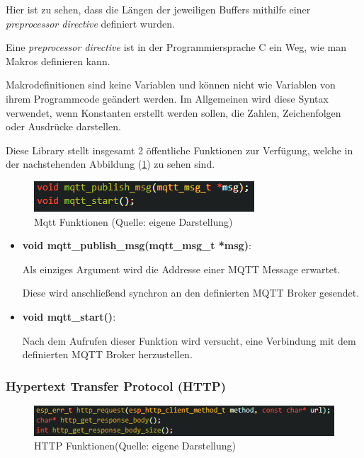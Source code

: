 Hier ist zu sehen, dass die Längen der jeweiligen Buffers mithilfe einer \textit{preprocessor directive} definiert wurden. 

Eine \textit{preprocessor directive} ist in der Programmiersprache C ein Weg, wie man Makros definieren kann. 

Makrodefinitionen sind keine Variablen und können nicht wie Variablen von ihrem Programmcode geändert werden. Im Allgemeinen wird diese Syntax verwendet, wenn Konstanten erstellt werden sollen, die Zahlen, Zeichenfolgen oder Ausdrücke darstellen.

Diese Library stellt insgesamt 2 öffentliche Funktionen zur Verfügung, welche in der nachstehenden Abbildung (\ref{abb:mqtt_functions}) zu sehen sind.

\begin{figure}[H]
    \begin{center}
        \includegraphics[scale=1]{images/mqtt_functions.png}
        \caption{Mqtt Funktionen (Quelle: eigene Darstellung)}
        \label{abb:mqtt_functions}
    \end{center}
\end{figure}

\begin{itemize}
    \item \textbf{void mqtt\_publish\_msg(mqtt\_msg\_t *msg)}:
    
    Als einziges Argument wird die Addresse einer MQTT Message erwartet.

    Diese wird anschließend synchron an den definierten MQTT Broker gesendet.

    \item \textbf{void mqtt\_start()}:
    
    Nach dem Aufrufen dieser Funktion wird versucht, eine Verbindung mit dem definierten MQTT Broker herzustellen.

\end{itemize}

\subsubsection{Hypertext Transfer Protocol (HTTP)}\label{sec:own-libraries-http}

\begin{figure}[H]
    \begin{center}
        \includegraphics[scale=1]{images/http_functions.png}
        \caption{HTTP Funktionen(Quelle: eigene Darstellung)}
        \label{abb:http_functions}
    \end{center}    
\end{figure}

